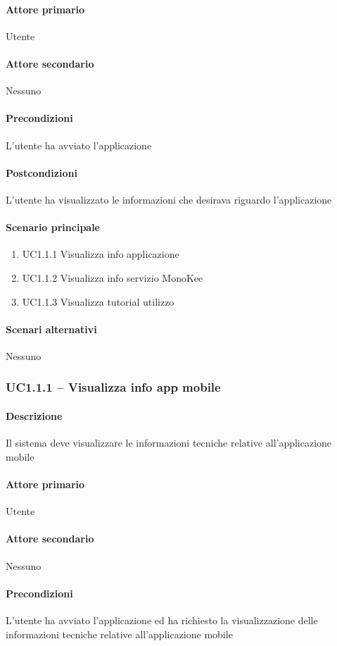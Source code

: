 \paragraph{Attore primario}  Utente
\paragraph{Attore secondario}  Nessuno
\paragraph{Precondizioni}  L’utente ha avviato l’applicazione
\paragraph{Postcondizioni}  L’utente ha visualizzato le informazioni che desirava riguardo l’applicazione
\paragraph{Scenario principale}  
    \begin{enumerate}
        \item UC1.1.1 Visualizza info applicazione
        \item UC1.1.2 Visualizza info servizio MonoKee
        \item UC1.1.3 Visualizza tutorial utilizzo
    \end{enumerate}
\paragraph{Scenari alternativi}  Nessuno


\subsubsection{UC1.1.1 – Visualizza info app mobile}
\paragraph{Descrizione}  Il sistema deve visualizzare le informazioni tecniche relative all’applicazione mobile
\paragraph{Attore primario}  Utente
\paragraph{Attore secondario}  Nessuno
\paragraph{Precondizioni}  L’utente ha avviato l’applicazione ed ha richiesto la visualizzazione delle informazioni tecniche relative all’applicazione mobile
